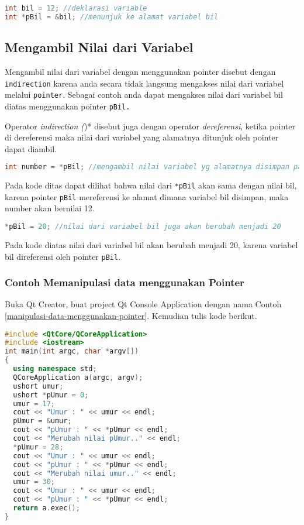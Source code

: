 \begin{lstlisting}[language=c++, numbers=none]
int bil = 12; //deklarasi variable
int *pBil = &bil; //menunjuk ke alamat variabel bil
\end{lstlisting}

\subsection{Mengambil Nilai dari
Variabel}\label{mengambil-nilai-dari-variabel}

Mengambil nilai dari variabel dengan menggunakan pointer disebut dengan
\texttt{indirection} karena anda secara tidak langsung mengakses nilai
dari variabel melalui \texttt{pointer}. Sebagai contoh anda dapat
mengakses nilai dari variabel bil diatas menggunakan pointer
\texttt{pBil.}

Operator \emph{indirection (})* disebut juga dengan operator
\emph{dereferensi}, ketika pointer di dereferensi maka nilai dari
variabel yang alamatnya ditunjuk oleh pointer dapat diambil.

\begin{lstlisting}[language=c++, numbers=none]
int number = *pBil; //mengambil nilai variabel yg alamatnya disimpan padapointer pBil
\end{lstlisting}

Pada kode ditas dapat dilihat bahwa nilai dari \texttt{*pBil} akan sama
dengan nilai bil, karena pointer \texttt{pBil} mereferensi ke alamat
dimana variabel bil disimpan, maka number akan bernilai 12.

\begin{lstlisting}[language=c++, numbers=none]
*pBil = 20; //nilai dari variabel bil juga akan berubah menjadi 20
\end{lstlisting}

Pada kode diatas nilai dari variabel bil akan berubah menjadi 20, karena
variabel bil direferensi oleh pointer \texttt{pBil}.

\subsubsection*{Contoh  Memanipulasi data menggunakan Pointer}

Buka Qt Creator, buat project Qt Console Application dengan nama Contoh
\ref{manipulasi-data-menggunakan-pointer}. Kemudian tulis kode berikut.

\begin{lstlisting}[language=c++, caption=Memanipulasi data menggunakan Pointer, label=manipulasi-data-menggunakan-pointer]
#include <QtCore/QCoreApplication>
#include <iostream>
int main(int argc, char *argv[])
{
  using namespace std;
  QCoreApplication a(argc, argv);
  ushort umur;
  ushort *pUmur = 0;
  umur = 17;
  cout << "Umur : " << umur << endl;
  pUmur = &umur;
  cout << "pUmur : " << *pUmur << endl;
  cout << "Merubah nilai pUmur.." << endl;
  *pUmur = 28;
  cout << "Umur : " << umur << endl;
  cout << "pUmur : " << *pUmur << endl;
  cout << "Merubah nilai umur.." << endl;
  umur = 30;
  cout << "Umur : " << umur << endl;
  cout << "pUmur : " << *pUmur << endl;
  return a.exec();
}
\end{lstlisting}

